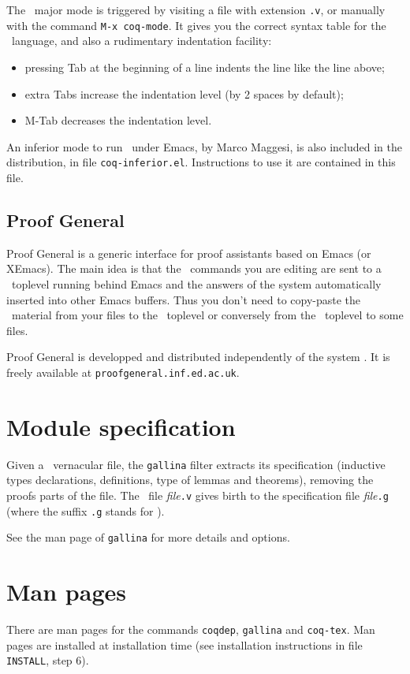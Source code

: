 The \Coq\ major mode is triggered by visiting a file with extension {\tt .v},
or manually with the command \verb!M-x coq-mode!.
It gives you the correct syntax table for
the \Coq\ language, and also a rudimentary indentation facility:
\begin{itemize}
  \item pressing {\sc Tab} at the beginning of a line indents the line like
    the line above;

  \item extra {\sc Tab}s increase the indentation level
    (by 2 spaces by default);

  \item M-{\sc Tab} decreases the indentation level.
\end{itemize}

An inferior mode to run \Coq\ under Emacs, by Marco Maggesi, is also
included in the distribution, in file \texttt{coq-inferior.el}.
Instructions to use it are contained in this file.

\subsection{Proof General}

Proof General is a generic interface for proof assistants based on
Emacs (or XEmacs). The main idea is that the \Coq\ commands you are
editing are sent to a \Coq\ toplevel running behind Emacs and the
answers of the system automatically inserted into other Emacs buffers. 
Thus you don't need to copy-paste the \Coq\ material from your files
to the \Coq\ toplevel or conversely from the \Coq\ toplevel to some
files. 

Proof General is developped and distributed independently of the
system \Coq. It is freely available at \verb!proofgeneral.inf.ed.ac.uk!.


\section{Module specification}\label{gallina}

Given a \Coq\ vernacular file, the {\tt gallina} filter extracts its
specification (inductive types declarations, definitions, type of
lemmas and theorems), removing the proofs parts of the file. The \Coq\
file {\em file}{\tt.v} gives birth to the specification file
{\em file}{\tt.g} (where the suffix {\tt.g} stands for \gallina).

See the man page of {\tt gallina} for more details and options.


\section{Man pages}\label{ManPages}

There are man pages for the commands {\tt coqdep}, {\tt gallina} and
{\tt coq-tex}. Man pages are installed at installation time
(see installation instructions in file {\tt INSTALL}, step 6).



